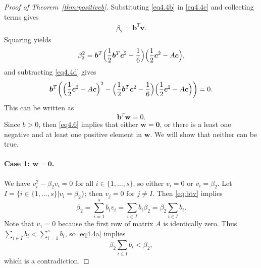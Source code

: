 \begin{proof}[Proof of Theorem~\ref{thm:positiveb}]
    Substituting \eqref{eq4.4b} in \eqref{eq4.4c} and collecting terms gives 
    \begin{align} \label{eq:btv}
        \beta_{2} = \bm{b}^{T}\bm{v}.
    \end{align}
    Squaring yields
    \begin{equation*}%
        \beta_{2}^{2} = \bm{b}^{T}\Bigl(\frac{1}{2}\bm{b}^{T}\bm{c}^{2} - \frac{1}{6}\Bigr)\Bigl(\frac{1}{2}\bm{c}^{2} - A\bm{c}\Bigr),
    \end{equation*}
    and subtracting \eqref{eq4.4d} gives
    \begin{equation*}
        \bm{b}^{T}\biggl(\Bigl(\frac{1}{2}\bm{c}^{2} - A\bm{c}\Bigr)^{2} - \Bigl(\frac{1}{2}\bm{b}^{T}\bm{c}^{2} - \frac{1}{6}\Bigr)\Bigl(\frac{1}{2}\bm{c}^{2} - A\bm{c}\Bigr)\biggr) = 0.
    \end{equation*}
    This can be written as
    \begin{equation}\label{eq4.6}
        \bm{b}^{T}\bm{w} = 0.
    \end{equation}
    Since $b>0$, then \eqref{eq4.6} implies that either \( \bm{w} = \bm{0} \),
or there is a least one negative and at least one positive element in \( \bm{w} \).
We will show that neither can be true.


\paragraph{Case 1: \( \bm{w} = \bm{0} \).}

We have \( v_{i}^{2} - \beta_{2}v_{i} = 0 \) for all \( i \in \{1,\dots,s\} \), so either \( v_{i} = 0 \) or \( v_{i} = \beta_{2} \).
Let \( I = \{ i \in\{1,\dots,s\} | v_{i} = \beta_{2} \} \); then \( v_{j} = 0 \) for \( j \neq I \). 
Then \eqref{eq:btv} implies 
$$ \beta_{2} = \sum_{i=1}^{s}b_{i}v_{i} = \sum_{i \in I}b_{i}\beta_{2} = \beta_{2}\sum_{i \in I}b_{i}.$$
Note that \( v_{1} = 0 \) because the first row of matrix \( A \) is identically zero. 
Thus $\sum_{i\in I}b_i < \sum_{i=1}^s b_i$, so \eqref{eq4.4a} implies
$$\beta_{2}\sum_{i \in I}b_{i}< \beta_{2},$$
which is a contradiction.


\end{proof}
